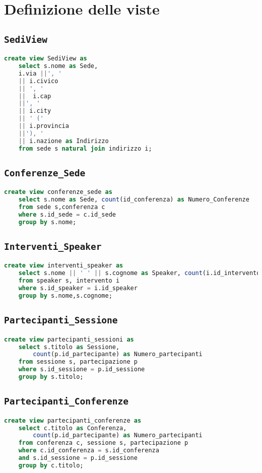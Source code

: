 \section{Definizione delle viste}
\subsection{\texttt{SediView}}
\begin{lstlisting}[language=SQL,style=mystyle]
	create view SediView as 
	select s.nome as Sede, 
	i.via ||', ' 
	|| i.civico
	|| ', ' 
	||  i.cap 
	||', ' 
	|| i.city 
	|| ' (' 
	|| i.provincia 
	||'), '
	|| i.nazione as Indirizzo
	from sede s natural join indirizzo i;
\end{lstlisting}
\subsection{\texttt{Conferenze\_Sede}}
\begin{lstlisting}[language=SQL,style=mystyle]
	create view conferenze_sede as
	select s.nome as Sede, count(id_conferenza) as Numero_Conferenze
	from sede s,conferenza c
	where s.id_sede = c.id_sede
	group by s.nome;
\end{lstlisting}
\subsection{\texttt{Interventi\_Speaker}}
\begin{lstlisting}[language=SQL,style=mystyle]
	create view interventi_speaker as
	select s.nome || ' ' || s.cognome as Speaker, count(i.id_intervento)
	from speaker s, intervento i 
	where s.id_speaker = i.id_speaker
	group by s.nome,s.cognome;
\end{lstlisting}
\subsection{\texttt{Partecipanti\_Sessione}}
\begin{lstlisting}[language=SQL,style=mystyle]
	create view partecipanti_sessioni as
	select s.titolo as Sessione, 
		count(p.id_partecipante) as Numero_partecipanti
	from sessione s, partecipazione p 
	where s.id_sessione = p.id_sessione
	group by s.titolo;
\end{lstlisting}
\subsection{\texttt{Partecipanti\_Conferenze}}
\begin{lstlisting}[language=SQL,style=mystyle]
	create view partecipanti_conferenze as
	select c.titolo as Conferenza, 
		count(p.id_partecipante) as Numero_partecipanti
	from conferenza c, sessione s, partecipazione p
	where c.id_conferenza = s.id_conferenza 
	and s.id_sessione = p.id_sessione
	group by c.titolo;
\end{lstlisting}
